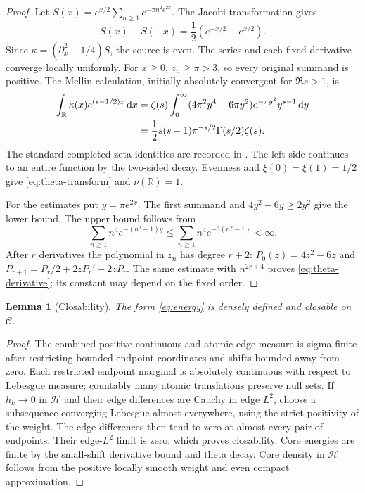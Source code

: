 \documentclass[11pt,a4paper]{article}
\newcommand{\R}{\mathbb R}
\newcommand{\HH}{\mathcal H}
\newcommand{\CC}{\mathcal C}
\newcommand{\dd}{\,\mathrm d}
\newtheorem{lemma}[theorem]{Lemma}
\theoremstyle{definition}
\theoremstyle{remark}
\numberwithin{equation}{section}
\begin{document}
\begin{proof}
Let $S(x)=e^{x/2}\sum_{n\ge1}e^{-\pi n^2e^{2x}}$. The Jacobi
transformation \cite[Eq.~20.7.32]{dlmf} gives
\[
 S(x)-S(-x)=\frac12(e^{-x/2}-e^{x/2}).
\]
Since $\kappa=(\partial_x^2-1/4)S$, the source is even. The series and
each fixed derivative converge locally uniformly. For $x\ge0$,
$z_n\ge\pi>3$, so every original summand is positive.
The Mellin calculation, initially absolutely convergent for $\Re s>1$,
is
\begin{align}\label{eq:mellin}
 \int_\R\kappa(x)e^{(s-1/2)x}\dd x
 &=\zeta(s)\int_0^\infty
       (4\pi^2y^4-6\pi y^2)e^{-\pi y^2}y^{s-1}\dd y\notag\\
 &=\frac12s(s-1)\pi^{-s/2}\Gamma(s/2)\zeta(s).
\end{align}
The standard completed-zeta identities are recorded in
\cite[Eqs.~25.4.3--25.4.4]{dlmf}. The left side continues to an entire
function by the two-sided decay. Evenness and $\xi(0)=\xi(1)=1/2$ give
\eqref{eq:theta-transform} and $\nu(\R)=1$.

For the estimates put $y=\pi e^{2x}$. The first summand and
$4y^2-6y\ge2y^2$ give the lower bound. The upper bound follows from
\[
 \sum_{n\ge1}n^4e^{-(n^2-1)y}
 \le\sum_{n\ge1}n^4e^{-3(n^2-1)}<\infty.
\]
After $r$ derivatives the polynomial in $z_n$ has degree $r+2$:
$P_0(z)=4z^2-6z$ and
$P_{r+1}=P_r/2+2zP_r'-2zP_r$.
The same estimate with $n^{2r+4}$ proves
\eqref{eq:theta-derivative}; its constant may depend on the fixed order.
\end{proof}

\begin{lemma}[Closability]\label{lem:closure}
The form \eqref{eq:energy} is densely defined and closable on $\CC$.
\end{lemma}
\begin{proof}
The combined positive continuous and atomic edge measure is sigma-finite
after restricting bounded endpoint coordinates and shifts bounded away
from zero. Each restricted endpoint marginal is absolutely continuous with
respect to Lebesgue measure; countably many atomic translations preserve
null sets. If $h_k\to0$ in $\HH$ and their edge differences are Cauchy in
edge $L^2$, choose a subsequence converging Lebesgue almost everywhere,
using the strict positivity of the weight. The edge differences then tend
to zero at almost every pair of endpoints. Their edge-$L^2$ limit is zero,
which proves closability. Core energies are finite by the small-shift
derivative bound and theta decay. Core density in $\HH$ follows from the
positive locally smooth weight and even compact approximation.
\end{proof}
\end{document}
